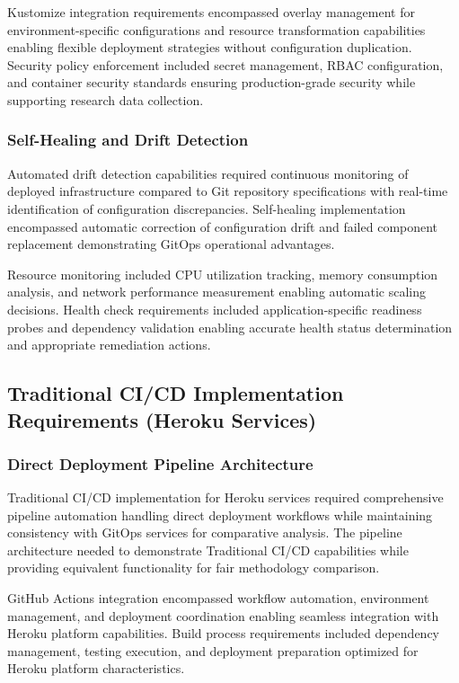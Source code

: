 Kustomize integration requirements encompassed overlay management for environment-specific configurations and resource transformation capabilities enabling flexible deployment strategies without configuration duplication. Security policy enforcement included secret management, RBAC configuration, and container security standards ensuring production-grade security while supporting research data collection.

\subsubsection{Self-Healing and Drift Detection}
Automated drift detection capabilities required continuous monitoring of deployed infrastructure compared to Git repository specifications with real-time identification of configuration discrepancies. Self-healing implementation encompassed automatic correction of configuration drift and failed component replacement demonstrating GitOps operational advantages.

Resource monitoring included CPU utilization tracking, memory consumption analysis, and network performance measurement enabling automatic scaling decisions. Health check requirements included application-specific readiness probes and dependency validation enabling accurate health status determination and appropriate remediation actions.

\subsection{Traditional CI/CD Implementation Requirements (Heroku Services)}

\subsubsection{Direct Deployment Pipeline Architecture}
Traditional CI/CD implementation for Heroku services required comprehensive pipeline automation handling direct deployment workflows while maintaining consistency with GitOps services for comparative analysis. The pipeline architecture needed to demonstrate Traditional CI/CD capabilities while providing equivalent functionality for fair methodology comparison.

GitHub Actions integration encompassed workflow automation, environment management, and deployment coordination enabling seamless integration with Heroku platform capabilities. Build process requirements included dependency management, testing execution, and deployment preparation optimized for Heroku platform characteristics.


